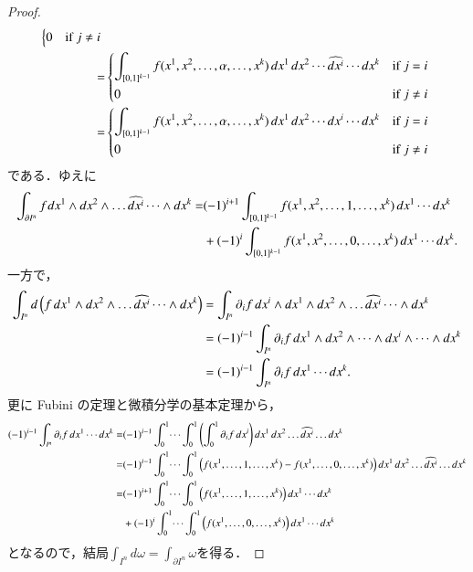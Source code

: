 \begin{proof}
\begin{align}
\begin{dcases*}
    0 & if $j \neq i$
  \end{dcases*} \\
=& \begin{dcases*}
    \int_{[0,1]^{k-1}} f (x^1, x^2, \dots, \alpha, \dots, x^k)  \dif x^1 \dif x^2 \cdots \widehat{\dif x^i} \cdots \dif x^k & if $j = i$ \\
    0 & if $j \neq i$
  \end{dcases*} \\
=& \begin{dcases*}
    \int_{[0,1]^{k-1}} f (x^1, x^2, \dots, \alpha, \dots, x^k)  \dif x^1 \dif x^2 \cdots \dif x^i \cdots \dif x^k & if $j = i$ \\
    0 & if $j \neq i$
  \end{dcases*}
\end{align}
である．ゆえに
\begin{align}
\int_{\partial I^n} f_{} \dif x^1 \wedge \dif x^2 \wedge \dots \widehat{\dif x^i} \dots \wedge \dif x^k
= &(-1)^{i+1} \int_{[0,1]^{k-1}} f (x^1, x^2, \dots, 1, \dots, x^k)  \dif x^1 \cdots \dif x^k \\
&+ (-1)^i \int_{[0,1]^{k-1}} f (x^1, x^2, \dots, 0, \dots, x^k)  \dif x^1 \cdots \dif x^k.
\end{align}
一方で，
\begin{align}
\int_{I^n} \dif \left( f \dif x^1 \wedge \dif x^2 \wedge \dots \widehat{\dif x^i} \dots \wedge \dif x^k \right) &= \int_{I^n} \partial_i f \dif x^i \wedge \dif x^1 \wedge \dif x^2 \wedge \dots \widehat{\dif x^i} \dots \wedge \dif x^k \\
&= (-1)^{i-1}\int_{I^n} \partial_i f \dif x^1 \wedge \dif x^2 \wedge \dots \wedge \dif x^i \wedge \dots \wedge \dif x^k \\
&= (-1)^{i-1}\int_{I^n} \partial_i f \dif x^1 \cdots \dif x^k.
\end{align}更に Fubini の定理と微積分学の基本定理から，
\begin{align}
(-1)^{i-1}\int_{I^n} \partial_i f \dif x^1 \cdots \dif x^k 
=&
(-1)^{i-1}\int_0^1 \dotsi \int_0^1 \left( \int_0^1  \partial_i f \dif x^i \right) \dif x^1  \dif x^2  \dots  \widehat{\dif x^i}  \dots \dif x^k \\
=&
(-1)^{i-1}\int_0^1 \dotsi \int_0^1 \left( f(x^1, \dots, 1, \dots, x^k) - f(x^1, \dots, 0, \dots, x^k) \right) \dif x^1  \dif x^2  \dots  \widehat{\dif x^i}  \dots \dif x^k \\
=&
(-1)^{i+1}\int_0^1 \dotsi \int_0^1 \left( f(x^1, \dots, 1, \dots, x^k) \right) \dif x^1  \cdots  \dif x^k \\
&+(-1)^{i}\int_0^1 \dotsi \int_0^1 \left( f(x^1, \dots, 0, \dots, x^k) \right) \dif x^1   \cdots  \dif x^k
\end{align}
となるので，結局$\int_{I^n} d \omega = \int_{\partial I^n} \omega$を得る．


\end{proof}
